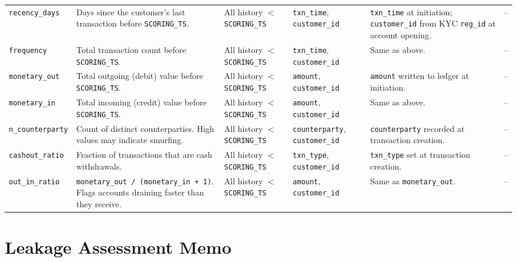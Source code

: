 \documentclass[11pt,a4paper]{article}
\begin{document}
\begin{center}
\begin{tabularx}{\textwidth}{@{}P{1.6cm} P{2.4cm} P{1.7cm} P{1.8cm} P{2.4cm} P{2.3cm}@{}}
\texttt{recency\_days} & Days since the customer's last transaction before \texttt{SCORING\_TS}. & All history $<$ \texttt{SCORING\_TS} & \texttt{txn\_time}, \texttt{customer\_id} & \texttt{txn\_time} at initiation; \texttt{customer\_id} from KYC \texttt{reg\_id} at account opening. & -- \\

\texttt{frequency} & Total transaction count before \texttt{SCORING\_TS}. & All history $<$ \texttt{SCORING\_TS} & \texttt{txn\_time}, \texttt{customer\_id} & Same as above. & -- \\

\texttt{monetary\_out} & Total outgoing (debit) value before \texttt{SCORING\_TS}. & All history $<$ \texttt{SCORING\_TS} & \texttt{amount}, \texttt{customer\_id} & \texttt{amount} written to ledger at initiation. & -- \\

\texttt{monetary\_in} & Total incoming (credit) value before \texttt{SCORING\_TS}. & All history $<$ \texttt{SCORING\_TS} & \texttt{amount}, \texttt{customer\_id} & Same as above. & -- \\

\texttt{n\_counterparty} & Count of distinct counterparties. High values may indicate smurfing. & All history $<$ \texttt{SCORING\_TS} & \texttt{counterparty}, \texttt{customer\_id} & \texttt{counterparty} recorded at transaction creation. & -- \\

\texttt{cashout\_ratio} & Fraction of transactions that are cash withdrawals. & All history $<$ \texttt{SCORING\_TS} & \texttt{txn\_type}, \texttt{customer\_id} & \texttt{txn\_type} set at transaction creation. & -- \\

\texttt{out\_in\_ratio} & \texttt{monetary\_out / (monetary\_in + 1)}. Flags accounts draining faster than they receive. & All history $<$ \texttt{SCORING\_TS} & \texttt{amount}, \texttt{customer\_id} & Same as \texttt{monetary\_out}. & -- \\

\bottomrule
\end{tabularx}
\end{center}

\section{Leakage Assessment Memo}
\end{document}
